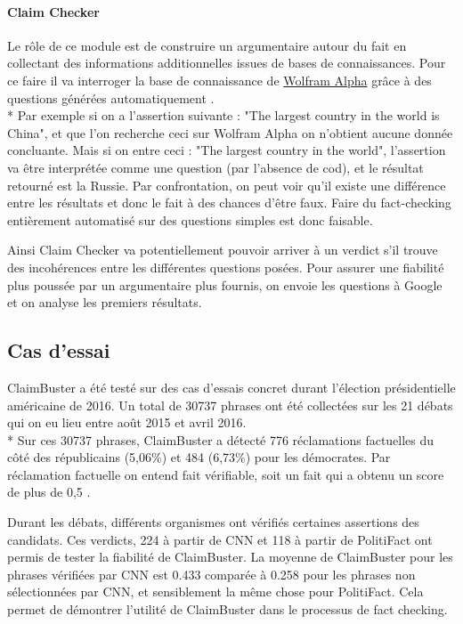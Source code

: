 \paragraph{Claim Checker}

Le rôle de ce module est de construire un argumentaire autour du fait en collectant des informations additionnelles issues de bases de connaissances. Pour ce faire il va interroger la base de connaissance de \href{https://www.wolframalpha.com/about.html}{Wolfram Alpha} grâce à des questions générées automatiquement \cite{heilman2009question}. 
\\*
Par exemple si on a l'assertion suivante : "The largest country in the world is China", et que l'on recherche ceci sur Wolfram Alpha on n'obtient aucune donnée concluante. Mais si on entre ceci : "The largest country in the world", l'assertion va être interprétée comme une question (par l'absence de cod), et le résultat retourné est la Russie. Par confrontation, on peut voir qu'il existe une différence entre les résultats et donc le fait à des chances d'être faux. Faire du fact-checking entièrement automatisé sur des questions simples est donc faisable.

Ainsi Claim Checker va potentiellement pouvoir arriver à un verdict s'il trouve des incohérences entre les différentes questions posées. Pour assurer une fiabilité plus poussée par un argumentaire plus fournis, on envoie les questions à Google et on analyse les premiers résultats.

\subsection{Cas d'essai}

ClaimBuster a été testé sur des cas d'essais concret durant l'élection présidentielle américaine de 2016. Un total de 30737 phrases ont été collectées sur les 21 débats qui on eu lieu entre août 2015 et avril 2016.
\\*
Sur ces 30737 phrases, ClaimBuster a détecté 776 réclamations factuelles du côté des républicains (5,06\%) et 484 (6,73\%) pour les démocrates. Par réclamation factuelle on entend fait vérifiable, soit un fait qui a obtenu un score de plus de 0,5 \cite{hassan2017toward}.

Durant les débats, différents organismes ont vérifiés certaines assertions des candidats. Ces verdicts, 224 à partir de CNN et 118 à partir de PolitiFact ont permis de tester la fiabilité de ClaimBuster. La moyenne de ClaimBuster pour les phrases vérifiées par CNN est 0.433 comparée à 0.258 pour les phrases non sélectionnées par CNN, et sensiblement la même chose pour PolitiFact. Cela permet de démontrer l'utilité de ClaimBuster dans le processus de fact checking.

